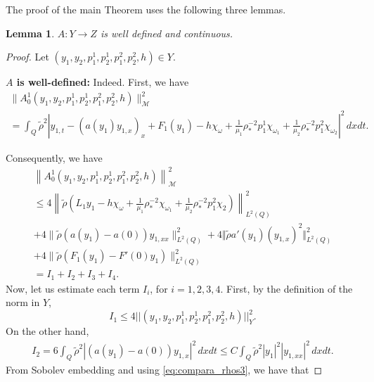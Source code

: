 \documentclass[11pt,a4paper]{amsart}
\numberwithin{equation}{section}
\newtheorem{lemma}{Lemma}[section]
\begin{document}
The proof of the main Theorem uses the following three lemmas.
\begin{lemma}\label{lema1}
$A : Y \rightarrow Z$ is well defined
and continuous.
\end{lemma}
\begin{proof} Let   $(y_1,y_2,p^1_1,p^1_2,p^2_1,p^2_2,h) \in Y$.

\textbf{  $A$ is well-defined: }
	Indeed. First, 	  we have
	$$
    \begin{array}{l}
        \parallel A_0^1 (y_1,y_2,p^1_1,p^1_2,p^2_1,p^2_2,h) \parallel^2_{\mathcal{ M}}\\
        \displaystyle=\int_{Q}\tilde{\rho}^{2}\left|y_{1,t}-(a(y_{1})y_{1,x})_{x}+F_{1}(y_{1})-h\chi_{\omega}+\frac{1}{\mu_{1}} \rho_*^{-2} p^{1}_{1}\chi_{\omega_{1}}+\frac{1}{\mu_{2}} \rho_*^{-2} p^{2}_{1}\chi_{\omega_{2}}  \right|^{2}\,dxdt.
    \end{array}
    $$
    
    \noindent Consequently, we have
    \begin{equation}\label{lemma-eq1}
        \begin{array}{l}
    	   \left\| A_0^1(y_1,y_2,p^1_1,p^1_2,p^2_1,p^2_2,h) \right\|^2_{\mathcal{ M}} \\[1.0em]
    	   \displaystyle \leq 4\left\|\tilde{\rho}\left( L_{1}y_{1}-h\chi_{\omega}+\frac{1}{\mu_{1}}\rho^{-2}_{\ast}\chi_{\omega_{1}}+\frac{1}{\mu_{2}}\rho^{-2}_{\ast}p^{2}_{1}\chi_{2}   \right) \right\|^{2}_{L^{2}(Q)}\\[1.0em]
    	   \displaystyle + 4 \|\tilde{\rho}\left(  a(y_{1})-a(0) \right)y_{1,xx}\|^{2}_{L^{2}(Q)}+4 \Vert\tilde{\rho}a'(y_{1})(y_{1,x})^{2}\Vert^{2}_{L^{2}(Q)}\\[1.0em]
    	   \displaystyle  +4 \|\tilde{\rho} \left( F_{1}(y_{1})-F'(0)y_{1} \right)\|^{2}_{L^{2}(Q)}\\ [1.0em]
    	   =I_{1}+I_{2}+I_{3}+I_{4}.
        \end{array}
    \end{equation}Now, let us estimate  each term $I_{i}$,  for  $i=1,2,3,4$. First, by the definition of the norm in $Y$,
    \begin{equation}\label{lemma-eq2}
    	I_{1}\leq 4  ||(y_1,y_2,p^1_1,p^1_2,p^2_1,p^2_2,h)||^{2}_{Y}.
    \end{equation}On the other hand,
    $$
    \begin{array}{l}
    	\displaystyle I_{2}=6\int_{Q}\tilde{\rho}^{2}|(a(y_{1})-a(0))y_{1,x}|^{2}\,dxdt
        \leq C \int_{Q}\tilde{\rho}^{2}|y_{1}|^{2}|y_{1,xx}|^{2}\,dxdt.
    \end{array}
    $$
    From Sobolev embedding and using \eqref{eq:compara_rhos3}, we have that
    

\end{proof}
\end{document}
